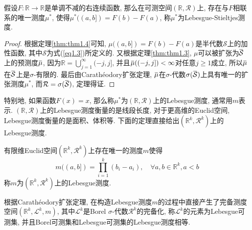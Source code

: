 \documentclass[cn, 12pt, math=mtpro2, bibstyle=apa, blue, twocol]{elegantbook}
\newcommand{\R}{\mathbb{R}}
\newcommand{\SE}{\mathcal{S}}
\newcommand{\overbar}[1]{\mkern 1.5mu\overline{\mkern-1.5mu#1\mkern-1.5mu}\mkern 1.5mu}
\begin{document}
\begin{theorem}
  假设$F:\R\to\R$是单调不减的右连续函数, 那么在可测空间$(\R,\mathcal{R})$上, 存在与$F$相联系的唯一测度$\mu^\ast$, 使得$\mu^\ast((a,b])=F(b)-F(a)$, 称$\mu^\ast$为Lebesgue-Stieltjes测度.
\end{theorem}
\begin{proof}
  根据定理\ref{thm:thm1.4}可知, $\mu((a,b])=F(b)-F(a)$是半代数$\SE$上的加性函数, 其中$\SE$为式(\ref{eq1.3})所定义的. 又根据定理\ref{thm:thm1.3}, $\mu$可以被扩张为$\overbar{\SE}$上的预测度$\overbar{\mu}$, 因为$\R=\bigcup_{j=1}^\infty(-j,j]$, 并且$\overbar{\mu}((-j,j])<\infty$对任意$j\geq1$成立, 所以$\overbar{\mu}$在$\overbar{\SE}$上是$\sigma$-有限的. 最后由Carathéodory扩张定理, $\overbar{\mu}$在$\sigma$-代数$\sigma(\overbar{\SE})$上具有唯一的扩张测度$\mu^\ast$, 而$\mathcal{R}=\sigma(\overbar{\SE})$, 定理得证.
\end{proof}
特别地, 如果函数$F(x)=x$, 那么称$\mu^\ast$为$(\R,\mathcal{R})$上的Lebesgue测度, 通常用$m$表示. $(\R,\mathcal{R})$上的Lebesgue测度衡量的是线段长度, 对于更高维的Euclid空间, Lebesgue测度衡量的是面积、体积等. 下面的定理直接给出$(\R^k,\mathcal{R}^k)$上的Lebesgue测度.

\begin{theorem}
  有限维Euclid空间$(\R^k,\mathcal{R}^k)$上存在唯一的测度$m$使得
  $$m((a,b])=\prod_{i=1}^{k}(b_i-a_i),\quad \forall a,b\in\R^k, a<b$$
  称$m$为$(\R^k,\mathcal{R}^k)$上的Lebesgue测度.
\end{theorem}

根据Carathéodory扩张定理, 在构造Lebesgue测度$m$的过程中直接产生了完备测度空间$(\R^k,\mathcal{L}^k,m)$, 其中$\mathcal{L}^k$是Borel $\sigma$-代数$\mathcal{R}^k$的完备化, 称$\mathcal{L}^k$的元素为Lebesgue可测集, 并且Borel可测集和Lebesgue可测集的Lebesgue测度相等.
\end{document}
